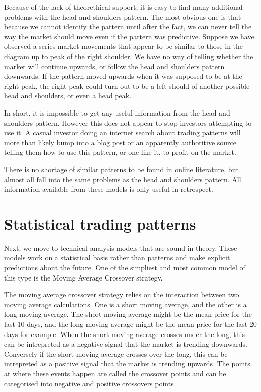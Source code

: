 \documentclass{report}
\begin{document}
Because of the lack of theorethical support, it is easy to find many additional problems with the head and shoulders pattern. The most obvious one is that because we cannot identify the pattern until after the fact, we can never tell the way the market should move even if the pattern was predictive. Suppose we have observed a series market movements that appear to be similar to those in the diagram up to peak of the right shoulder. We have no way of telling whether the market will continue upwards, or follow the head and shoulders pattern downwards. If the pattern moved upwards when it was supposed to be at the right peak, the right peak could turn out to be a left should of another possible head and shoulders, or even a head peak.

In short, it is impossible to get any useful information from the head and shoulders pattern. However this does not appear to stop investors attempting to use it. A casual investor doing an internet search about trading patterns will more than likely bump into a blog post or an apparently authoritive source telling them how to use this pattern, or one like it, to profit on the market. 

There is no shortage of similar patterns to be found in online literature, but almost all fall into the same problems as the head and shoulders pattern. All information available from these models is only useful in retrospect. 

\section{Statistical trading patterns}

Next, we move to technical analysis models that are sound in theory. These models work on a statistical basis rather than patterns and make explicit predictions about the future. One of the simpliest and most common model of this type is the Moving Average Crossover strategy.

The moving average crossover strategy relies on the interaction between two moving average calculations. One is a short moving average, and the other is a long moving average. The short moving average might be the mean price for the last 10 days, and the long moving average might be the mean price for the last 20 days for example. When the short moving average crosses under the long, this can be intrepreted as a negative signal that the market is trending downwards. Conversely if the short moving average crosses over the long, this can be intrepreted as a positive signal that the market is trending upwards. The points at where these events happen are called the crossover points and can be categorised into negative and positive crossovers points.
\end{document}
